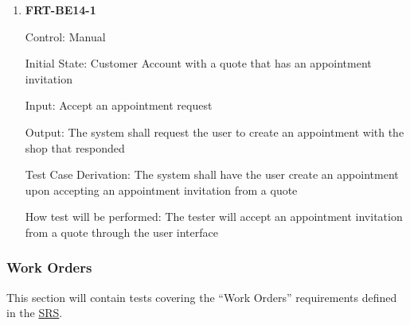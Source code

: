 \documentclass[12pt, titlepage]{article}
\begin{document}
\begin{enumerate}
	\item \textbf{FRT-BE14-1}

	      Control: Manual

	      Initial State: Customer Account with a quote that has an appointment invitation

	      Input: Accept an appointment request

	      Output: The system shall request the user to create an appointment with the shop that responded

	      Test Case Derivation: The system shall have the user create an appointment upon accepting an
	      appointment invitation from a quote

	      How test will be performed: The tester will accept an appointment invitation from a quote through
	      the user interface
\end{enumerate}

\subsubsection{Work Orders}

This section will contain tests covering the ``Work Orders'' requirements defined in the
\href{https://github.com/arkinmodi/project-sayyara/blob/main/docs/SRS/SRS.pdf}{SRS}.
\end{document}
